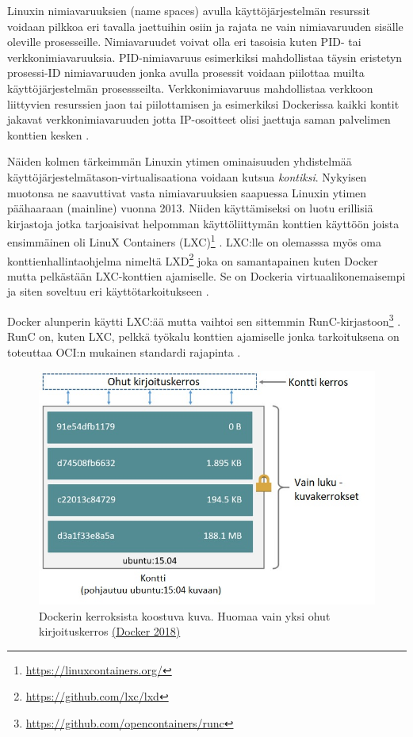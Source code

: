 \documentclass[finnish,gradu]{tktltiki3}
\begin{document}
Linuxin nimiavaruuksien (name spaces) avulla käyttöjärjestelmän resurssit voidaan pilkkoa eri tavalla jaettuihin osiin ja rajata ne vain nimiavaruuden sisälle oleville prosesseille. Nimiavaruudet voivat olla eri tasoisia kuten PID- tai verkkonimiavaruuksia. PID-nimiavaruus esimerkiksi mahdollistaa täysin eristetyn prosessi-ID nimiavaruuden jonka avulla prosessit voidaan piilottaa muilta käyttöjärjestelmän prosessseilta. Verkkonimiavaruus mahdollistaa verkkoon liittyvien resurssien jaon tai piilottamisen ja esimerkiksi Dockerissa kaikki kontit jakavat verkkonimiavaruuden jotta IP-osoitteet olisi jaettuja saman palvelimen konttien kesken \cite{containers-vs-vms}.

Näiden kolmen tärkeimmän Linuxin ytimen ominaisuuden yhdistelmää käyttöjärjestelmätason-virtualisaationa voidaan kutsua \textit{kontiksi}. Nykyisen muotonsa ne saavuttivat vasta nimiavaruuksien saapuessa Linuxin ytimen päähaaraan (mainline) vuonna 2013. Niiden käyttämiseksi on luotu erillisiä kirjastoja jotka tarjoaisivat helpomman käyttöliittymän konttien käyttöön joista ensimmäinen oli LinuX Containers (LXC)\footnote{\url{https://linuxcontainers.org/}} \cite{docker}. LXC:lle on olemasssa myös oma konttienhallintaohjelma nimeltä LXD\footnote{\url{https://github.com/lxc/lxd}} joka on samantapainen kuten Docker mutta pelkästään LXC-konttien ajamiselle. Se on Dockeria virtuaalikonemaisempi ja siten soveltuu eri käyttötarkoitukseen \cite{lxd}.

Docker alunperin käytti LXC:ää mutta vaihtoi sen sittemmin RunC-kirjastoon\footnote{\url{https://github.com/opencontainers/runc}} \cite{introducing-runc}. RunC on, kuten LXC, pelkkä työkalu konttien ajamiselle jonka tarkoituksena on toteuttaa OCI:n mukainen standardi rajapinta \cite{runc-blog}.

\begin{figure}[h]
    \centering
    \includegraphics[width=1\textwidth]{images/container-layers.jpg}
    \caption{Dockerin kerroksista koostuva kuva. Huomaa vain yksi ohut kirjoituskerros \href{https://docs.docker.com/storage/storagedriver/\#images-and-layers}{(Docker 2018)}}
    \label{fig:container-layers}
\end{figure}
\end{document}
